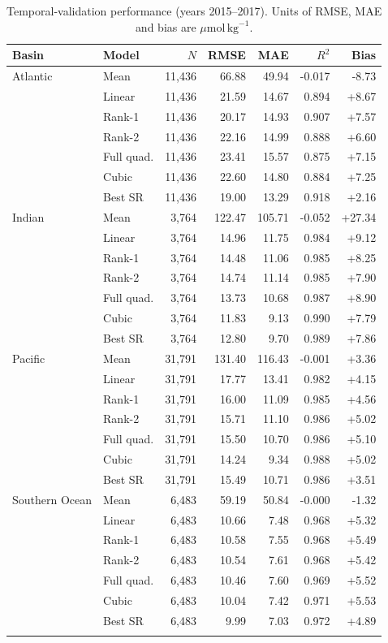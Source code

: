 \begin{table}[htbp]
\centering
\caption{Temporal-validation performance (years 2015--2017). Units of RMSE, MAE and bias are $\mu\mathrm{mol}\,\mathrm{kg}^{-1}$.}
\label{tab:temporal}
\small
\begin{tabular}{llrrrrr}
\toprule
Basin & Model & $N$ & RMSE & MAE & $R^2$ & Bias \\
\midrule
Atlantic & Mean & 11,436 & 66.88 & 49.94 & -0.017 & -8.73 \\
 & Linear & 11,436 & 21.59 & 14.67 & 0.894 & +8.67 \\
 & Rank-1 & 11,436 & 20.17 & 14.93 & 0.907 & +7.57 \\
 & Rank-2 & 11,436 & 22.16 & 14.99 & 0.888 & +6.60 \\
 & Full quad. & 11,436 & 23.41 & 15.57 & 0.875 & +7.15 \\
 & Cubic & 11,436 & 22.60 & 14.80 & 0.884 & +7.25 \\
 & Best SR & 11,436 & 19.00 & 13.29 & 0.918 & +2.16 \\
\addlinespace
Indian & Mean & 3,764 & 122.47 & 105.71 & -0.052 & +27.34 \\
 & Linear & 3,764 & 14.96 & 11.75 & 0.984 & +9.12 \\
 & Rank-1 & 3,764 & 14.48 & 11.06 & 0.985 & +8.25 \\
 & Rank-2 & 3,764 & 14.74 & 11.14 & 0.985 & +7.90 \\
 & Full quad. & 3,764 & 13.73 & 10.68 & 0.987 & +8.90 \\
 & Cubic & 3,764 & 11.83 & 9.13 & 0.990 & +7.79 \\
 & Best SR & 3,764 & 12.80 & 9.70 & 0.989 & +7.86 \\
\addlinespace
Pacific & Mean & 31,791 & 131.40 & 116.43 & -0.001 & +3.36 \\
 & Linear & 31,791 & 17.77 & 13.41 & 0.982 & +4.15 \\
 & Rank-1 & 31,791 & 16.00 & 11.09 & 0.985 & +4.56 \\
 & Rank-2 & 31,791 & 15.71 & 11.10 & 0.986 & +5.02 \\
 & Full quad. & 31,791 & 15.50 & 10.70 & 0.986 & +5.10 \\
 & Cubic & 31,791 & 14.24 & 9.34 & 0.988 & +5.02 \\
 & Best SR & 31,791 & 15.49 & 10.71 & 0.986 & +3.51 \\
\addlinespace
Southern Ocean & Mean & 6,483 & 59.19 & 50.84 & -0.000 & -1.32 \\
 & Linear & 6,483 & 10.66 & 7.48 & 0.968 & +5.32 \\
 & Rank-1 & 6,483 & 10.58 & 7.55 & 0.968 & +5.49 \\
 & Rank-2 & 6,483 & 10.54 & 7.61 & 0.968 & +5.42 \\
 & Full quad. & 6,483 & 10.46 & 7.60 & 0.969 & +5.52 \\
 & Cubic & 6,483 & 10.04 & 7.42 & 0.971 & +5.53 \\
 & Best SR & 6,483 & 9.99 & 7.03 & 0.972 & +4.89 \\
\addlinespace
\bottomrule
\end{tabular}
\end{table}
